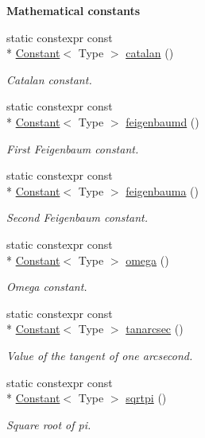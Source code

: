 \begin{Indent}{\bf Mathematical constants}
\begin{DoxyCompactItemize}
static constexpr const \\*
\hyperlink{exceptionmagrathea_1_1Constant}{Constant}$<$ Type $>$ \hyperlink{exceptionmagrathea_1_1Constants_ae639a013c155d2796367ba00063bff3d}{catalan} ()
\begin{DoxyCompactList}\small\item\em Catalan constant. \end{DoxyCompactList}\item 
static constexpr const \\*
\hyperlink{exceptionmagrathea_1_1Constant}{Constant}$<$ Type $>$ \hyperlink{exceptionmagrathea_1_1Constants_a7ad303fda971abb4a53a92791f3d0156}{feigenbaumd} ()
\begin{DoxyCompactList}\small\item\em First Feigenbaum constant. \end{DoxyCompactList}\item 
static constexpr const \\*
\hyperlink{exceptionmagrathea_1_1Constant}{Constant}$<$ Type $>$ \hyperlink{exceptionmagrathea_1_1Constants_a51b3e036387031bccca2dcb00b5545e0}{feigenbauma} ()
\begin{DoxyCompactList}\small\item\em Second Feigenbaum constant. \end{DoxyCompactList}\item 
static constexpr const \\*
\hyperlink{exceptionmagrathea_1_1Constant}{Constant}$<$ Type $>$ \hyperlink{exceptionmagrathea_1_1Constants_ae3166f0f4edc0968939904c652dae6ba}{omega} ()
\begin{DoxyCompactList}\small\item\em Omega constant. \end{DoxyCompactList}\item 
static constexpr const \\*
\hyperlink{exceptionmagrathea_1_1Constant}{Constant}$<$ Type $>$ \hyperlink{exceptionmagrathea_1_1Constants_a1b7ad146d52be054947fce4a1b26b339}{tanarcsec} ()
\begin{DoxyCompactList}\small\item\em Value of the tangent of one arcsecond. \end{DoxyCompactList}\item 
static constexpr const \\*
\hyperlink{exceptionmagrathea_1_1Constant}{Constant}$<$ Type $>$ \hyperlink{exceptionmagrathea_1_1Constants_a9304603b0098b9c394b531dcd2b3015f}{sqrtpi} ()
\begin{DoxyCompactList}\small\item\em Square root of pi. \end{DoxyCompactList}\item 

\end{DoxyCompactItemize}
\end{Indent}
